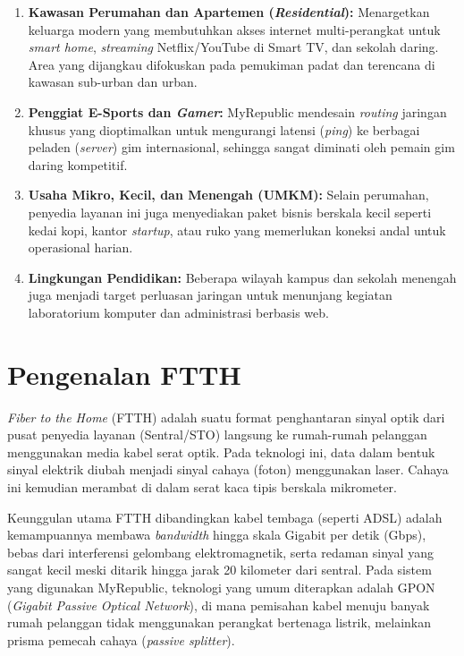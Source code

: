\documentclass[12pt,a4paper]{article}
\begin{document}
\begin{enumerate}
    \item \textbf{Kawasan Perumahan dan Apartemen (\textit{Residential}):} Menargetkan keluarga modern yang membutuhkan akses internet multi-perangkat untuk \textit{smart home}, \textit{streaming} Netflix/YouTube di Smart TV, dan sekolah daring. Area yang dijangkau difokuskan pada pemukiman padat dan terencana di kawasan sub-urban dan urban.
    \item \textbf{Penggiat E-Sports dan \textit{Gamer}:} MyRepublic mendesain \textit{routing} jaringan khusus yang dioptimalkan untuk mengurangi latensi (\textit{ping}) ke berbagai peladen (\textit{server}) gim internasional, sehingga sangat diminati oleh pemain gim daring kompetitif.
    \item \textbf{Usaha Mikro, Kecil, dan Menengah (UMKM):} Selain perumahan, penyedia layanan ini juga menyediakan paket bisnis berskala kecil seperti kedai kopi, kantor \textit{startup}, atau ruko yang memerlukan koneksi andal untuk operasional harian.
    \item \textbf{Lingkungan Pendidikan:} Beberapa wilayah kampus dan sekolah menengah juga menjadi target perluasan jaringan untuk menunjang kegiatan laboratorium komputer dan administrasi berbasis web.
\end{enumerate}

\section{Pengenalan FTTH}

\textit{Fiber to the Home} (FTTH) adalah suatu format penghantaran sinyal optik dari pusat penyedia layanan (Sentral/STO) langsung ke rumah-rumah pelanggan menggunakan media kabel serat optik. Pada teknologi ini, data dalam bentuk sinyal elektrik diubah menjadi sinyal cahaya (foton) menggunakan laser. Cahaya ini kemudian merambat di dalam serat kaca tipis berskala mikrometer.

Keunggulan utama FTTH dibandingkan kabel tembaga (seperti ADSL) adalah kemampuannya membawa \textit{bandwidth} hingga skala Gigabit per detik (Gbps), bebas dari interferensi gelombang elektromagnetik, serta redaman sinyal yang sangat kecil meski ditarik hingga jarak 20 kilometer dari sentral. Pada sistem yang digunakan MyRepublic, teknologi yang umum diterapkan adalah GPON (\textit{Gigabit Passive Optical Network}), di mana pemisahan kabel menuju banyak rumah pelanggan tidak menggunakan perangkat bertenaga listrik, melainkan prisma pemecah cahaya (\textit{passive splitter}).
\end{document}
